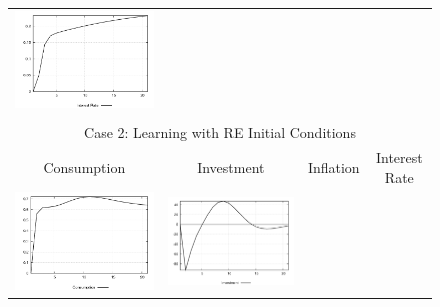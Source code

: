 \begin{figure}
\begin{tabular}{cccc}
\includegraphics[scale=0.22]{results_re/Interest_Rate_prefshock_irf.png} \\ \\ 
\multicolumn{4}{c}{Case 2: Learning with RE Initial Conditions}\\
Consumption & Investment & Inflation & Interest Rate \\ 
\includegraphics[scale=0.22]{results_reallinit/Consumption_prefshock_irf.png} & 
\includegraphics[scale=0.22]{results_reallinit/Investment_prefshock_irf.png} & 

\end{tabular}
\end{figure}
